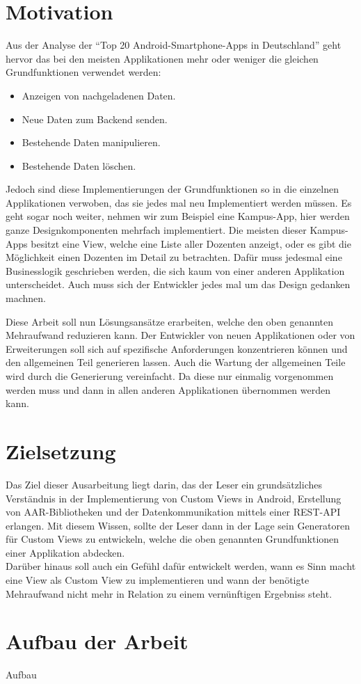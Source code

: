 \section{Motivation}\label{sec:motivation}
Aus der Analyse der \enquote{Top 20 Android-Smartphone-Apps in Deutschland} \cite{top_apps} geht hervor das bei den meisten Applikationen mehr oder weniger die gleichen Grundfunktionen verwendet werden:
\begin{itemize}
	\item Anzeigen von nachgeladenen Daten.
	\item Neue Daten zum Backend senden.
	\item Bestehende Daten manipulieren.
	\item Bestehende Daten löschen.
\end{itemize}

Jedoch sind diese Implementierungen der Grundfunktionen so in die einzelnen Applikationen verwoben, das sie jedes mal neu Implementiert werden müssen. Es geht sogar noch weiter, nehmen wir zum Beispiel eine Kampus-App, hier werden ganze Designkomponenten mehrfach implementiert. Die meisten dieser Kampus-Apps besitzt eine View, welche eine Liste aller Dozenten anzeigt, oder es gibt die Möglichkeit einen Dozenten im Detail zu betrachten. Dafür muss jedesmal eine Businesslogik geschrieben werden, die sich kaum von einer anderen Applikation unterscheidet. Auch muss sich der Entwickler jedes mal um das Design gedanken machnen. 

Diese Arbeit soll nun Lösungsansätze erarbeiten, welche den oben genannten Mehraufwand reduzieren kann. Der Entwickler von neuen Applikationen oder von Erweiterungen soll sich auf spezifische Anforderungen konzentrieren können und den allgemeinen Teil generieren lassen.
Auch die Wartung der allgemeinen Teile wird durch die Generierung vereinfacht. Da diese nur einmalig vorgenommen werden muss und dann in allen anderen Applikationen übernommen werden kann.

\section{Zielsetzung}\label{sec:target}
Das Ziel dieser Ausarbeitung liegt darin, das der Leser ein grundsätzliches Verständnis in der Implementierung von Custom Views in Android, Erstellung von AAR-Bibliotheken und der Datenkommunikation mittels einer REST-API erlangen. Mit diesem Wissen, sollte der Leser dann in der Lage sein Generatoren für Custom Views zu entwickeln, welche die oben genannten Grundfunktionen einer Applikation abdecken.\\
Darüber hinaus soll auch ein Gefühl dafür entwickelt werden, wann es Sinn macht eine View als Custom View zu implementieren und wann der benötigte Mehraufwand nicht mehr in Relation zu einem vernünftigen Ergebniss steht.


\section{Aufbau der Arbeit}\label{sec:structure}
Aufbau